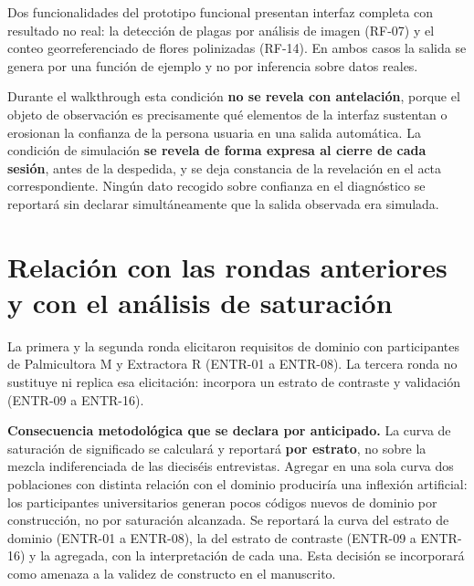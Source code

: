 \documentclass[11pt,a4paper]{article}
\begin{document}
\begin{tcolorbox}[colback=red!4,colframe=red!55!black,boxrule=0.8pt,arc=2pt,left=6pt,right=6pt,top=5pt,bottom=5pt]
Dos funcionalidades del prototipo funcional presentan interfaz completa con resultado no real: la detección
de plagas por análisis de imagen (RF-07) y el conteo georreferenciado de flores polinizadas (RF-14). En
ambos casos la salida se genera por una función de ejemplo y no por inferencia sobre datos reales.

Durante el walkthrough esta condición \textbf{no se revela con antelación}, porque el objeto de observación
es precisamente qué elementos de la interfaz sustentan o erosionan la confianza de la persona usuaria en una
salida automática. La condición de simulación \textbf{se revela de forma expresa al cierre de cada sesión},
antes de la despedida, y se deja constancia de la revelación en el acta correspondiente. Ningún dato
recogido sobre confianza en el diagnóstico se reportará sin declarar simultáneamente que la salida
observada era simulada.
\end{tcolorbox}

\section{Relación con las rondas anteriores y con el análisis de saturación}

La primera y la segunda ronda elicitaron requisitos de dominio con participantes de Palmicultora M y
Extractora R (ENTR-01 a ENTR-08). La tercera ronda no sustituye ni replica esa elicitación: incorpora un
estrato de contraste y validación (ENTR-09 a ENTR-16).

\begin{tcolorbox}[colback=grisclaro,colframe=black!35,boxrule=0.6pt,arc=2pt,left=6pt,right=6pt,top=4pt,bottom=4pt]
\textbf{Consecuencia metodológica que se declara por anticipado.} La curva de saturación de significado se
calculará y reportará \textbf{por estrato}, no sobre la mezcla indiferenciada de las dieciséis entrevistas.
Agregar en una sola curva dos poblaciones con distinta relación con el dominio produciría una inflexión
artificial: los participantes universitarios generan pocos códigos nuevos de dominio por construcción, no
por saturación alcanzada. Se reportará la curva del estrato de dominio (ENTR-01 a ENTR-08), la del estrato
de contraste (ENTR-09 a ENTR-16) y la agregada, con la interpretación de cada una. Esta decisión se
incorporará como amenaza a la validez de constructo en el manuscrito.
\end{tcolorbox}
\end{document}
